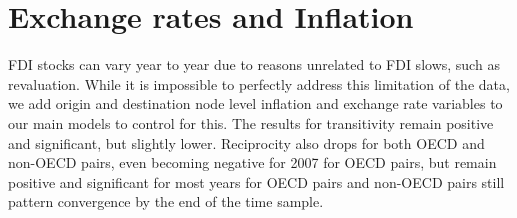 \documentclass[reqno,onecolumn,letterpaper,12pt]{article}
\begin{document}
{\section{Exchange rates and Inflation}\label{xrresults}

FDI stocks can vary year to year due to reasons unrelated to FDI slows, such as revaluation. While it is impossible to perfectly address this limitation of the data, we add origin and destination node level inflation and exchange rate variables to our main models to control for this. The results for transitivity remain positive and significant, but slightly lower. Reciprocity also drops for both OECD and non-OECD pairs, even becoming negative for 2007 for OECD pairs, but remain positive and significant for most years for OECD pairs and non-OECD pairs still pattern convergence by the end of the time sample.\\


}
\end{document}
